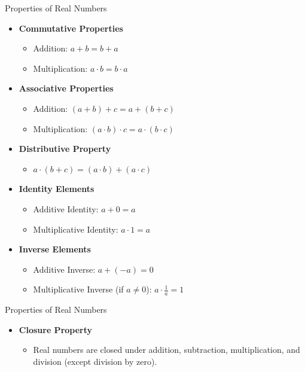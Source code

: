 \documentclass{beamer}
\begin{document}
\begin{frame}{Properties of Real Numbers}
  \begin{itemize}
      \item \textbf{Commutative Properties}
      \begin{itemize}
          \item Addition: $a + b = b + a$
          \item Multiplication: $a \cdot b = b \cdot a$
      \end{itemize}
      \vspace{5pt}

      \item \textbf{Associative Properties}
      \begin{itemize}
          \item Addition: $(a + b) + c = a + (b + c)$
          \item Multiplication: $(a \cdot b) \cdot c = a \cdot (b \cdot c)$
      \end{itemize}
      \vspace{5pt}
      \item \textbf{Distributive Property}
      \begin{itemize}
          \item $a \cdot (b + c) = (a \cdot b) + (a \cdot c)$
      \end{itemize}
      \vspace{5pt}
      \item \textbf{Identity Elements}
      \begin{itemize}
          \item Additive Identity: $a + 0 = a$
          \item Multiplicative Identity: $a \cdot 1 = a$
      \end{itemize}
      \vspace{5pt}
      \item \textbf{Inverse Elements}
      \begin{itemize}
          \item Additive Inverse: $a + (-a) = 0$
          \item Multiplicative Inverse (if $a \neq 0$): $a \cdot \frac{1}{a} = 1$
      \end{itemize}
    \end{itemize}
    \end{frame}
    \begin{frame}{Properties of Real Numbers}
    \begin{itemize}
      \vspace{5pt}
      \item \textbf{Closure Property}
      \begin{itemize}
          \item Real numbers are closed under addition, subtraction, multiplication, and division (except division by zero).
      \end{itemize}
  \end{itemize}
  \end{frame}
\end{document}

